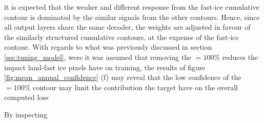it is expected that the weaker and different response from the fast-ice cumulative contour is dominated by the similar signals from the other contours. Hence, since all output layers share the same decoder, the weights are adjusted in favour of the similarly structured cumulative contours, at the expense of the fast-ice contour. With regards to what was previously discussed in section \ref{sec:tuning_model}, were it was assumed that removing the $=100\%$ reduces the impact land-fast ice pixels have on training, the results of figure \ref{fig:mean_annual_confidence} (f) may reveal that the low confidence of the $=100\%$ contour may limit the contribution the target have on the overall computed loss

By inspecting 

\biblio
